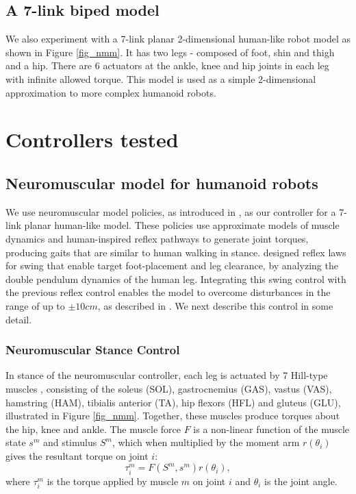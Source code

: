 \subsection{A 7-link biped model}
\label{sec:7_link_biped}
We also experiment with a 7-link planar 2-dimensional human-like robot model as shown in Figure \ref{fig_nmm}. It has two legs - composed of foot, shin and thigh and a hip. There are 6 actuators at the ankle, knee and hip joints in each leg with infinite allowed torque. This model is used as a simple 2-dimensional approximation to more complex humanoid robots. 

\section{Controllers tested}

\subsection{Neuromuscular model for humanoid robots}

\label{sec:NMC}
We use neuromuscular model policies, as introduced in \cite{geyer2010muscle}, as our controller for a 7-link planar human-like model. These policies use approximate models of muscle dynamics and human-inspired reflex pathways to generate joint torques, producing gaits that are similar to human walking in stance. \cite{desai} designed reflex laws for swing that enable target foot-placement and leg clearance, by analyzing the double pendulum dynamics of the human leg. Integrating this swing control with the previous reflex control enables the model to overcome disturbances in the range of up to $\pm 10 cm$, as described in \cite{song2015neural}. We next describe this control in some detail.

\subsubsection{Neuromuscular Stance Control} 

In stance of the neuromuscular controller, each leg is actuated by 7 Hill-type muscles \cite{morrison1970mechanics}, consisting of the soleus (SOL), gastrocnemius (GAS), vastus (VAS), hamstring (HAM), tibialis anterior (TA), hip flexors (HFL) and gluteus (GLU), illustrated in Figure \ref{fig_nmm}. Together, these muscles produce torques about the hip, knee and ankle. The muscle force $F$ is a non-linear function of the muscle state $s^m$ and stimulus $S^m$, which when multiplied by the moment arm $r(\theta_i)$ gives the resultant torque on joint $i$:
\begin{equation*}
\tau_i^m = F(S^m, s^m)r(\theta_i),
\end{equation*}   
where $\tau_i^m$ is the torque applied by muscle $m$ on joint $i$ and $\theta_i$ is the joint angle.
 
